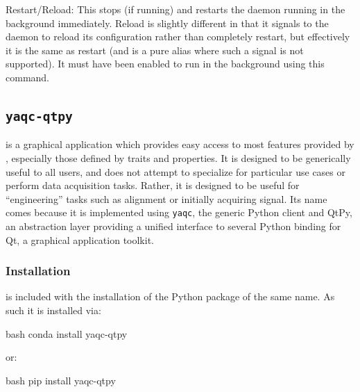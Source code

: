 Restart/Reload: This stops (if running) and restarts the daemon running
in the background immediately. Reload is slightly different in that it
signals to the daemon to reload its configuration rather than completely
restart, but effectively it is the same as restart (and is a pure alias
where such a signal is not supported). It must have been enabled to run
in the background using this command.




\subsection{\texttt{yaqc-qtpy}}

\yaqcqtpy{} is a graphical application which provides easy access to most features provided by \yaq{}, especially those defined by traits and properties.
It is designed to be generically useful to all \yaq{} users, and does not attempt to specialize for particular use cases or perform data acquisition tasks.
Rather, it is designed to be useful for ``engineering'' tasks such as alignment or initially acquiring signal.
Its name comes because it is implemented using \texttt{yaqc}\cite{}, the generic Python \yaq{} client and QtPy\cite{}, an abstraction layer providing a unified interface to several Python binding for Qt\cite{}, a graphical application toolkit.

\subsubsection{Installation}

 
\yaqcqtpy{} is included with the installation of the Python package of the same name.
As such it is installed via:
 
\begin{codefragment}{bash}
conda install yaqc-qtpy
\end{codefragment}
 
or:                                                                                                                  
 
\begin{codefragment}{bash}
pip install yaqc-qtpy
\end{codefragment}

